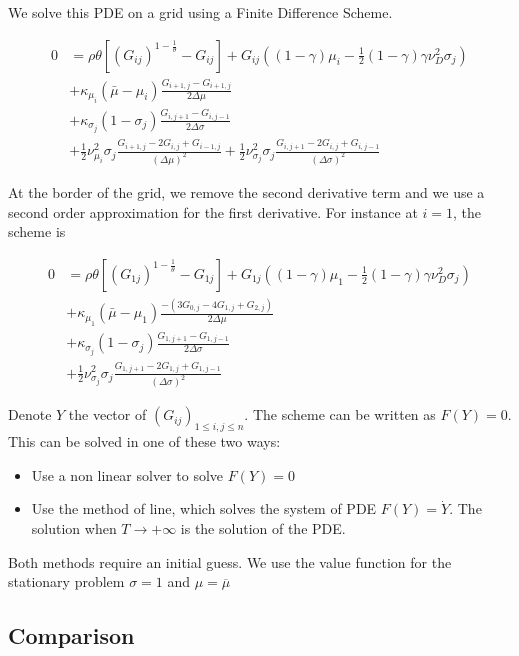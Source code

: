 \documentclass[english]{article}
\begin{document}
We solve this PDE on a grid using a Finite Difference Scheme. 

\begin{align*}
	0&= \rho \theta[(G_{ij})^{1-\frac{1}{\theta}}- G_{ij}]+G_{ij}((1-\gamma)\mu_i-\frac{1}{2}(1-\gamma)\gamma\nu_D^2\sigma_j)\\
	&+\kappa_{\mu_i}(\bar{\mu}-\mu_i)\frac{G_{i+1, j}-G_{i+1, j}}{2\Delta \mu}\\
	&+\kappa_{\sigma_j}(1-\sigma_j)\frac{G_{i, j+1}-G_{i,j-1}}{2\Delta \sigma}\\
	&+\frac{1}{2}\nu_{\mu_i}^{2}\sigma_j\frac{G_{i+1, j} - 2 G_{i, j} + G_{i-1, j}}{(\Delta\mu)^2}+\frac{1}{2}\nu_{\sigma_j}^{2}\sigma_j\frac{G_{i, j+1} - 2 G_{i, j} + G_{i, j-1}}{(\Delta\sigma)^2}
\end{align*}

At the border of the grid, we remove the second derivative term and we use a second order approximation for the first derivative. For instance at $i = 1$, the scheme is 

\begin{align*}
	0&= \rho \theta[(G_{1j})^{1-\frac{1}{\theta}}- G_{1j}]+G_{1j}((1-\gamma)\mu_1-\frac{1}{2}(1-\gamma)\gamma\nu_D^2\sigma_j)\\
	&+\kappa_{\mu_1}(\bar{\mu}-\mu_1)\frac{-(3G_{0,j} - 4 G_{1,j} + G_{2,j})}{2\Delta \mu}\\
	&+\kappa_{\sigma_j}(1-\sigma_j)\frac{G_{1, j+1}-G_{1,j-1}}{2\Delta \sigma}\\
	&+\frac{1}{2}\nu_{\sigma_j}^{2}\sigma_j\frac{G_{1, j+1} - 2 G_{1, j} + G_{1, j-1}}{(\Delta\sigma)^2}
\end{align*}


Denote $Y$ the vector of  $(G_{ij})_{1 \leq i,j\leq n}$. The scheme can be written as $F(Y) = 0$. This can be solved in one of these two ways:
\begin{itemize}
	\item Use a non linear solver to solve $F(Y) = 0$
	\item Use the method of line, which solves the system of PDE $F(Y) = \dot{Y}$. The solution when $T\rightarrow +\infty$ is the solution of the PDE.
\end{itemize}

Both methods require an initial guess. We use the value function for the stationary problem $\sigma = 1$ and $\mu = \overline{\mu}$
			
\subsection{Comparison}
\end{document}
